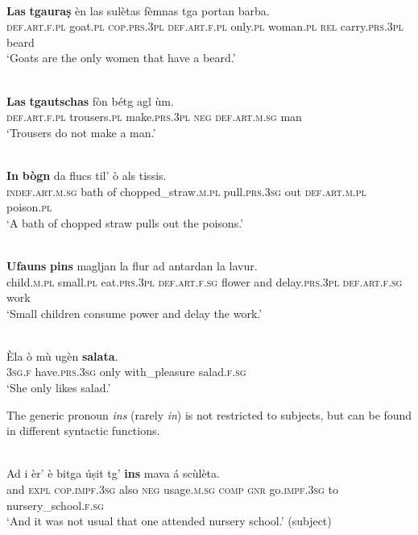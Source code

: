 \ea
\label{ex:gen:2}
\\
\gll  \textbf{Las} \textbf{tgauraṣ} èn las sulètas fèmnas tga portan barba.\\
     \textsc{def.art.f.pl} goat.\textsc{pl} \textsc{cop.prs.3pl} \textsc{def.art.f.pl} only.\textsc{pl} woman.\textsc{pl} \textsc{rel} carry.\textsc{prs.3pl} beard\\
\glt `Goats are the only women that have a beard.'
\z

\ea\label{ex:gen:3}
\\
\gll \textbf{Las} \textbf{tgautschas} fòn bétg agl ùm. \\
  \textsc{def.art.f.pl} trousers.\textsc{pl} make.\textsc{prs.3pl} \textsc{neg} \textsc{def.art.m.sg} man \\
\glt `Trousers do not make a man.'
\z


\ea\label{ex:gen:4}
\\
\gll  \textbf{In} \textbf{bògn} da flucs til’ ò als tissis.\\
\textsc{indef.art.m.sg} bath of chopped\_straw.\textsc{m.pl} pull.\textsc{prs.3sg} out \textsc{def.art.m.pl} poison.\textsc{pl} \\
\glt `A bath of chopped straw pulls out the poisons.'
\z

\ea\label{ex:gen:5}
\\
\gll  \textbf{Ufauns} \textbf{pins} magljan la flur ad antardan la lavur.\\
child.\textsc{m.pl} small.\textsc{pl} eat.\textsc{prs.3pl} \textsc{def.art.f.sg} flower and delay.\textsc{prs.3pl} \textsc{def.art.f.sg} work\\
\glt `Small children consume power and delay the work.'
\z

\ea\label{ex:gen:6}
\\
\gll Èla ò mù ugèn \textbf{salata}.\\
\textsc{3sg.f} have.\textsc{prs.3sg} only with\_pleasure salad.\textsc{f.sg}\\
\glt `She only likes salad.'
\z

The generic pronoun \textit{ins} (rarely \textit{in}) is not restricted to subjects, but can be found in different syntactic functions.

\ea\label{ex:ins:1}
\\ 
\gll Ad i èr’ è bitga úṣit tg’ \textbf{ins} mava á scùlèta.\\
and  \textsc{expl} \textsc{cop.impf.3sg} also \textsc{neg} usage.\textsc{m.sg}  \textsc{comp} \textsc{gnr} go.\textsc{impf.3sg} to nursery\_school.\textsc{f.sg}\\
\glt `And it was not usual that one attended nursery school.' (subject)
\z

